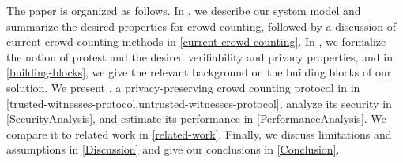 
The paper is organized as follows.
In , we describe our system model and summarize the desired 
properties for crowd counting, followed by a discussion of current 
crowd-counting methods in \cref{current-crowd-counting}. In , 
we formalize the notion of protest and the desired verifiability and privacy 
properties, and in \cref{building-blocks}, we give the relevant background on 
the building blocks of our solution.
%
%
We present \CROCUS, a privacy-preserving crowd counting 
protocol in in \cref{trusted-witnesses-protocol,untrusted-witnesses-protocol}, 
analyze its security in \cref{SecurityAnalysis}, and estimate its performance 
in \cref{PerformanceAnalysis}.
We compare it to related work in \cref{related-work}.
Finally, we discuss limitations and assumptions in \cref{Discussion} and give 
our conclusions in \cref{Conclusion}.
